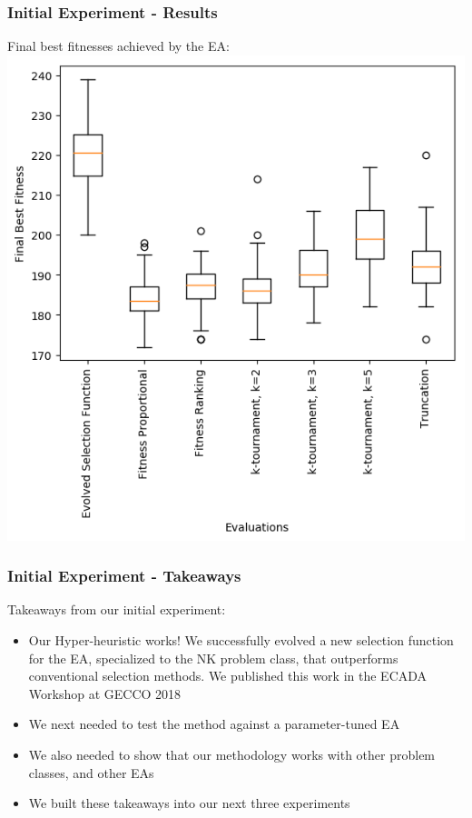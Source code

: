 \documentclass{beamer}
\begin{document}
	\begin{frame}
		\centering
		\frametitle{Initial Experiment - Results}
		Final best fitnesses achieved by the EA:		
		\includegraphics[height=0.8\textheight]{nk_landscape_boxplot}
	\end{frame}	
	
	\begin{frame}
		\frametitle{Initial Experiment - Takeaways}
		Takeaways from our initial experiment:
		\begin{itemize}
			 \item<2-|alert@2> Our Hyper-heuristic works! We successfully evolved a new selection function for the EA, specialized to the NK problem class, that outperforms conventional selection methods. We published this work in the ECADA Workshop at GECCO 2018
			 \item<3-|alert@3> We next needed to test the method against a parameter-tuned EA		 
			 \item<4-|alert@4> We also needed to show that our methodology works with other problem classes, and other EAs
			 \item<5-|alert@5> We built these takeaways into our next three experiments
		\end{itemize}
	\end{frame}	
	
\end{document}
